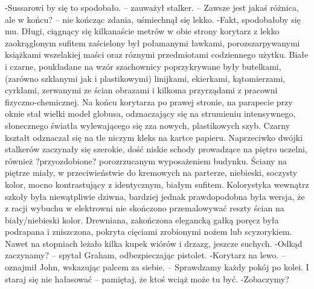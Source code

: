 \documentclass[../MAIN.tex]{subfiles}
\begin{document}
-Sussarowi by się to spodobało. -- zauważył stalker. -- Zawsze jest jakaś różnica, ale w końcu? -- nie kończąc zdania, uśmiechnął się lekko.
-Fakt, spodobałoby się mu.
Długi, ciągnący się kilkanaście metrów w obie strony korytarz z lekko zaokrąglonym sufitem zaścielony był połamanymi ławkami, porozszarpywanymi książkami wszelakiej maści oraz róznymi przedmiotami codziennego użytku. Białe i czarne, poukładane na wzór szachownicy poprzykrywane były butelkami, (zarówno szklanymi jak i plastikowymi) linijkami, ekierkami, kątomierzami, cyrklami, zerwanymi ze ścian obrazami i kilkoma przyrządami z pracowni fizyczno-chemicznej.
Na końcu korytarza po prawej stronie, na parapecie przy oknie stał wielki model globusa, odznaczający się na strumieniu intensywnego, słonecznego światła wylewającego się zza nowych, plastikowych szyb. Czarny kształt odznaczał się na tle niczym kleks na kartce papieru.
Naprzeciwko dwójki stalkerów zaczynały się szerokie, dość niskie schody prowadzące na piętro uczelni, również ?przyozdobione? porozrzucanym wyposażeniem budynku. Ściany na piętrze miały, w przeciwieństwie do kremowych na parterze, niebieski, soczysty kolor, mocno kontrastujący z identycznym, białym sufitem. Kolorystyka wewnątrz szkoły była niewątpliwie dziwna, bardziej jednak prawdopodobna była wersja, że z racji wybuchu w elektrowni nie skończono przemalowywać reszty ścian na biały/niebieski kolor.
Drewniana, zakończona elegancką gałką poręcz była podrapana i zniszczona, pokryta cięciami zrobionymi nożem lub scyzorykiem. Nawet na stopniach leżało kilka kupek wiórów i drzazg, jeszcze suchych.
-Odkąd zaczynamy? -- spytał Graham, odbezpieczając pistolet.
-Korytarz na lewo. -- oznajmił John, wskazując palcem za siebie. -- Sprawdzamy każdy pokój po kolei. I staraj się nie hałasować -- pamiętaj, że ktoś wciąż może tu być.
-Zobaczymy?
\end{document}

